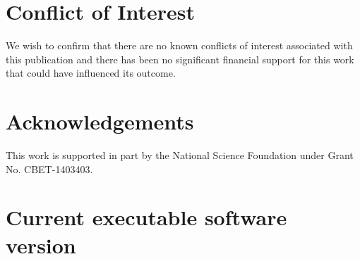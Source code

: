 \documentclass[preprint,12pt, a4paper]{elsarticle}
\begin{document}
\section{Conflict of Interest}
%

We wish to confirm that there are no known conflicts of interest associated with this publication and there has been no significant financial support for this work that could have influenced its outcome.

\section*{Acknowledgements}
\label{acknoledgements}

This work is supported in part by the National Science Foundation under Grant No. CBET-1403403.





 
 

\section*{Current executable software version}
\label{software_version}
\end{document}
